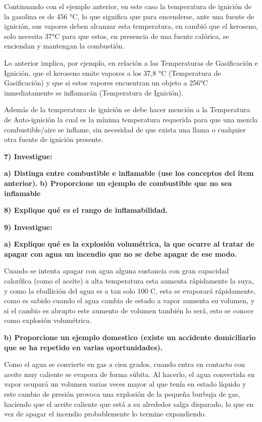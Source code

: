 \documentclass[letterpaper,11pt]{article}
\begin{document}
\begin{itemize}
    Continuando con el ejemplo anterior, en este caso la temperatura de ignición de la gasolina es de 456 °C, lo que significa que para encenderse, ante una fuente de ignición, sus vapores deben alcanzar esta temperatura, en cambió que el keroseno, solo necesita 37°C para que estos, en presencia de una fuente calórica, se enciendan y mantengan la combustión.
    
    Lo anterior implica, por ejemplo, en relación a las Temperaturas de Gasificación e Ignición, que el keroseno emite vapores a los 37,8 °C (Temperatura de Gasificación) y que si estos vapores encuentran un objeto a 256°C inmediatamente se inflamarán (Temperatura de Ignición).
    
    Además de la temperatura de ignición se debe hacer mención a la Temperatura de Auto-ignición la cual es la mínima temperatura requerida para que una mezcla combustible/aire se inflame, sin necesidad de que exista una llama o cualquier otra fuente de ignición presente.
    
    
\end{itemize}

\textbf{7) Investigue:}

\textbf{a) Distinga entre combustible e inflamable (use los conceptos del ítem
anterior).}
\textbf{b) Proporcione un ejemplo de combustible que no sea inflamable}

\textbf{8) Explique qué es el rango de inflamabilidad.}

\textbf{9) Investigue:}

\textbf{a) Explique qué es la explosión volumétrica, la que ocurre al tratar de apagar con agua un incendio que no se debe apagar de ese modo.}

Cuando se intenta apagar con agua alguna sustancia con gran capacidad calorífica (como el aceite) a alta temperatura esta aumenta rápidamente la suya, y como la ebullición del agua es a tan solo 100 C, esta se evaporará rápidamente, como es sabido cuando el agua cambia de estado a vapor aumenta su volumen, y si el cambio es abrupto este aumento de volumen también lo será, esto se conoce como explosión volumétrica.

\textbf{b) Proporcione un ejemplo domestico (existe un accidente domiciliario que se ha repetido en varias oportunidades).}

Como el agua se convierte en gas a cien grados, cuando entra en contacto con aceite muy caliente se evapora de forma súbita. Al hacerlo, el agua convertida en vapor ocupará un volumen varias veces mayor al que tenía en estado líquido y este cambio de presión provoca una explosión de la pequeña burbuja de gas, haciendo que el aceite caliente que está a su alrededor salga disparado, lo que en vez de apagar el incendio probablemente lo termine expandiendo.
\end{document}
